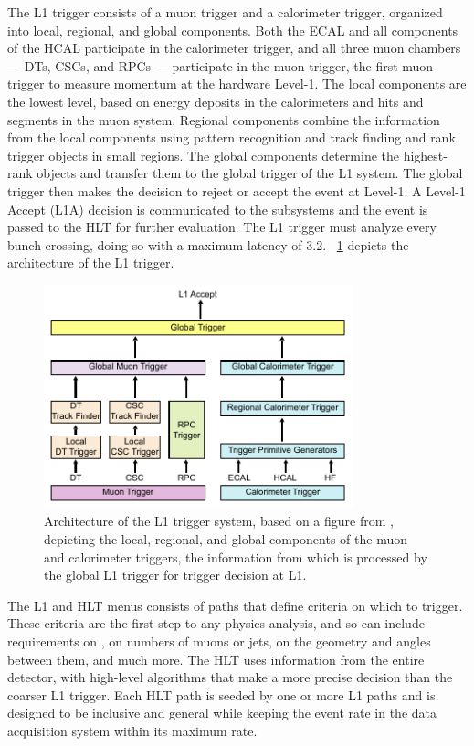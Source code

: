 The L1 trigger consists of a muon trigger and a calorimeter trigger, organized into local, regional, and global components.
Both the ECAL and all components of the HCAL participate in the calorimeter trigger, and all three muon chambers --- DTs, CSCs, and RPCs --- participate in the muon trigger, the first muon trigger to measure momentum at the hardware Level-1.
The local components are the lowest level, based on energy deposits in the calorimeters and hits and segments in the muon system.
Regional components combine the information from the local components using pattern recognition and track finding and rank trigger objects in small regions.
The global components determine the highest-rank objects and transfer them to the global trigger of the L1 system.
The global trigger then makes the decision to reject or accept the event at Level-1.
A Level-1 Accept (L1A) decision is communicated to the subsystems and the event is passed to the HLT for further evaluation.
The L1 trigger must analyze every bunch crossing, doing so with a maximum latency of 3.2\mus.
\Fig~\ref{cms:L1} depicts the architecture of the L1 trigger.

\begin{figure}[tb]
  \centering
  \includegraphics[width=0.8\textwidth]{figures/cms/L1Architecture.pdf}
  \caption[Architecture of the L1 trigger system, depicting the local, regional, and global components of the muon and calorimeter triggers.]{Architecture of the L1 trigger system, based on a figure from \cite{Chatrchyan:2008zzk}, depicting the local, regional, and global components of the muon and calorimeter triggers, the information from which is processed by the global L1 trigger for trigger decision at L1.}
  \label{cms:L1}
\end{figure}

\pagebreak
The L1 and HLT menus consists of paths that define criteria on which to trigger.
These criteria are the first step to any physics analysis, and so can include requirements on \pT, on numbers of muons or jets, on the geometry and angles between them, and much more.
The HLT uses information from the entire detector, with high-level algorithms that make a more precise decision than the coarser L1 trigger.
Each HLT path is seeded by one or more L1 paths and is designed to be inclusive and general while keeping the event rate in the data acquisition system within its maximum rate.

